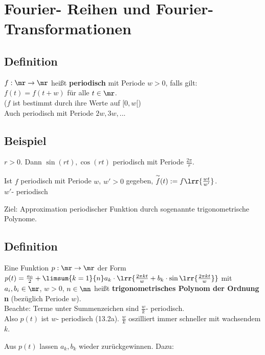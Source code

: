 \newpage
\section{Fourier- Reihen und Fourier- Transformationen}
\subsection{Definition}
	$ f:\mr\rightarrow\mr $ heißt \textbf{periodisch} mit Periode $ w>0 $, falls gilt:\\
	$ f(t)=f(t+w) $ für alle $ t\in\mr $.\\
	($ f $ ist bestimmt durch ihre Werte auf $ [0,w[ $)\\
	Auch periodisch mit Periode $ 2w,3w,... $

\subsection{Beispiel}
	\item $ r>0 $. Dann $ \sin(rt),\cos(rt) $ periodisch mit Periode $ \frac{2\pi}{r} $.
	\item Ist $ f $ periodisch mit Periode $ w $, $ w'>0 $ gegeben, $ \overset{\sim}{f}(t):=f\lrr{\frac{wt}{w'}} $.\\
	$ w' $- periodisch
	\subExEnd
	
	Ziel: Approximation periodischer Funktion durch sogenannte trigonometrische Polynome.
	
\subsection{Definition}
	Eine Funktion $ p:\mr\rightarrow\mr $ der Form $ p(t)=\frac{a_0}{2}+\limsum{k=1}{n}a_k\cdot\lrr{\frac{2\pi kt}{w}+b_k\cdot\sin\lrr{\frac{2\pi kt}{w}}} $ mit $ a_i,b_i\in\mr $, $ w>0 $, $ n\in\mn $ heißt \textbf{trigonometrisches Polynom der Ordnung n} (bezüglich Periode $ w $).\\
	Beachte: Terme unter Summenzeichen sind $ \frac{w}{k} $- periodisch.\\
	Also $ p(t) $ ist $ w $- periodisch (13.2a).
	$ \frac{w}{k} $ oszilliert immer schneller mit wachsendem $ k $.
	
	Aus $ p(t) $ lassen $ a_k,b_k $ wieder zurückgewinnen. Dazu:


